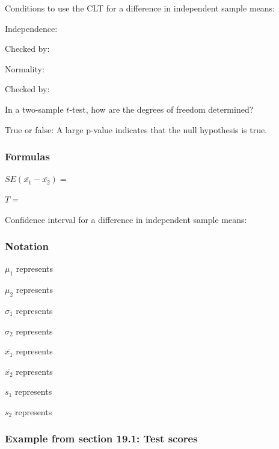 \documentclass[
]{report}
\newcommand{\rgs}{\vspace{12pt}} %
\newcommand{\rgi}{\hspace{24pt}}  %
\begin{document}
Conditions to use the CLT for a difference in independent sample means:

\rgi Independence:
\rgs

\rgi \rgi Checked by:
\rgs

\rgi Normality:
\rgs

\rgi \rgi Checked by:
\rgs

In a two-sample \(t\)-test, how are the degrees of freedom determined?
\rgs        

True or false: A large p-value indicates that the null hypothesis is true.
\rgs

\hypertarget{formulas-3}{%
\subsubsection*{Formulas}\label{formulas-3}}

\(SE(\overline{x_1} - \overline{x_2})=\)
\rgs

\(T=\)
\rgs

Confidence interval for a difference in independent sample means:
\rgs

\hypertarget{notation-2}{%
\subsubsection*{Notation}\label{notation-2}}

\(\mu_1\) represents
\rgs

\(\mu_2\) represents
\rgs

\(\sigma_1\) represents
\rgs

\(\sigma_2\) represents
\rgs

\(\overline{x_1}\) represents
\rgs

\(\overline{x_2}\) represents
\rgs

\(s_1\) represents
\rgs

\(s_2\) represents
\rgs

\hypertarget{example-from-section-19.1-test-scores}{%
\subsubsection*{Example from section 19.1: Test scores}\label{example-from-section-19.1-test-scores}}
\end{document}
